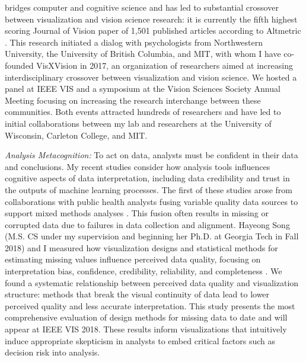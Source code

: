 \documentclass[11pt]{article}
\begin{document}
bridges computer and cognitive science and has led to substantial crossover between visualization and vision science research: it is currently the fifth highest scoring Journal of Vision paper of 1,501 published articles according to Altmetric 
\cite{szafir2016Four}. This research initiated a dialog with psychologists from Northwestern University, the University of British Columbia, and MIT, with whom I have co-founded VisXVision in 2017, an organization of researchers aimed at increasing interdisciplinary crossover between visualization and vision science. We hosted a panel at IEEE VIS \cite{nothelfer2017Vision} and a symposium at the Vision Sciences Society Annual Meeting \cite{nothelfer2018Vision} focusing on increasing the research interchange between these communities. Both events attracted hundreds of researchers and have led to initial collaborations between my lab and researchers at the University of Wisconsin, Carleton College, and MIT. 

\emph{Analysis Metacognition: }To act on data, analysts must be confident in their data and conclusions. My recent studies 
consider how analysis tools influences cognitive aspects of data interpretation, including data credibility and trust in the outputs of machine learning processes. 
The first of these studies arose from 
collaborations with public health analysts 
fusing variable quality data sources to support mixed methods analyses \cite{pruss2018Zika}. This fusion often results in
missing or corrupted data due to failures in data collection and alignment. Hayeong Song (M.S. CS under my supervision and beginning her Ph.D. at Georgia Tech in Fall 2018) and I measured how visualization designs and statistical methods for estimating missing values influence perceived data quality, focusing on interpretation bias, confidence, credibility, reliability, and completeness \cite{song2019Wheres}. We found a systematic relationship between perceived data quality and visualization structure: methods that break the visual continuity of data lead to lower perceived quality and less accurate interpretation. This study presents the most comprehensive evaluation of design methods for missing data to date and will appear at IEEE VIS 2018. These results inform visualizations that intuitively induce appropriate skepticism in analysts to embed critical factors such as decision risk into analysis.
\end{document}
